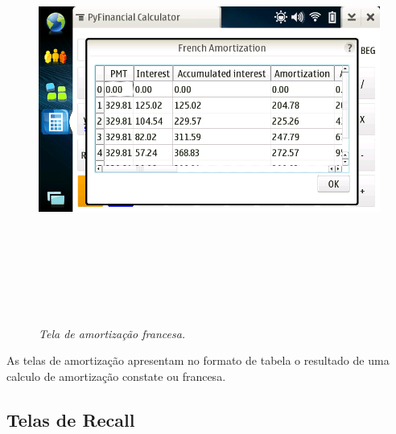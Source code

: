 \begin{figure}[!h]
 \includegraphics[height = 14cm]{tela_fas.png}
 \caption{\it Tela de amortização francesa.} \label{tab:tela_fas}
\end{figure}


As telas de amortização apresentam no formato de tabela o resultado de uma calculo de
amortização constate ou francesa.


\subsection{Telas de Recall}

